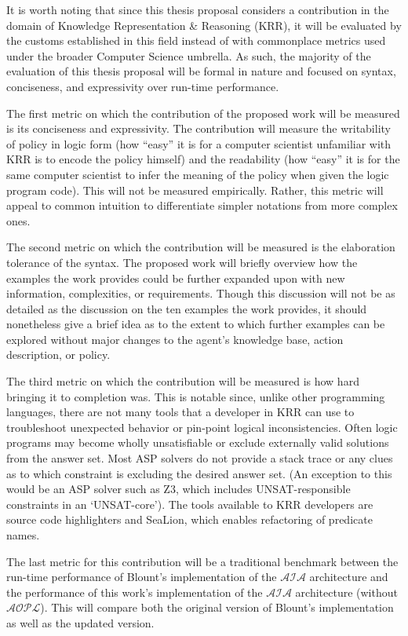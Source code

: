 It is worth noting that since this thesis proposal considers a contribution in the domain of Knowledge Representation \& Reasoning (KRR), it will be evaluated by the customs established in this field instead of with commonplace metrics used under the broader Computer Science umbrella.
As such, the majority of the evaluation of this thesis proposal will be formal in nature and focused on syntax, conciseness, and expressivity over run-time performance.

The first metric on which the contribution of the proposed work will be measured is its conciseness and expressivity.
The contribution will measure the writability of policy in logic form (how ``easy'' it is for a computer scientist unfamiliar with KRR is to encode the policy himself) and the readability (how ``easy'' it is for the same computer scientist to infer the meaning of the policy when given the logic program code).
This will not be measured empirically.
Rather, this metric will appeal to common intuition to differentiate simpler notations from more complex ones.

The second metric on which the contribution will be measured is the elaboration tolerance of the syntax.
The proposed work will briefly overview how the examples the work provides could be further expanded upon with new information, complexities, or requirements.
Though this discussion will not be as detailed as the discussion on the ten examples the work provides, it should nonetheless give a brief idea as to the extent to which further examples can be explored without major changes to the agent's knowledge base, action description, or policy.

The third metric on which the contribution will be measured is how hard bringing it to completion was.
This is notable since, unlike other programming languages, there are not many tools that a developer in KRR can use to troubleshoot unexpected behavior or pin-point logical inconsistencies.
Often logic programs may become wholly unsatisfiable or exclude externally valid solutions from the answer set.
Most ASP solvers do not provide a stack trace or any clues as to which constraint is excluding the desired answer set.
(An exception to this would be an ASP solver such as Z3, which includes UNSAT-responsible constraints in an `UNSAT-core').
The tools available to KRR developers are source code highlighters and SeaLion, which enables refactoring of predicate names.

The last metric for this contribution will be a traditional benchmark between the run-time performance of Blount's implementation of the $\mathcal{AIA}$ architecture and the performance of this work's implementation of the $\mathcal{AIA}$ architecture (without $\mathcal{AOPL}$).
This will compare both the original version of Blount's implementation as well as the updated version.

